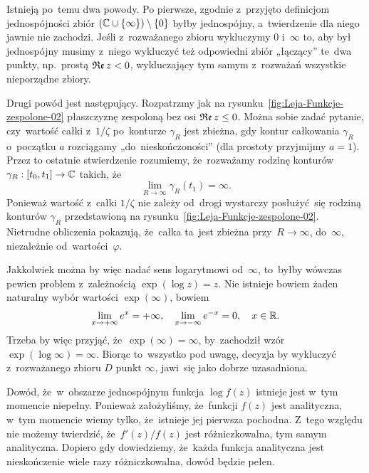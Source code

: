 \documentclass[a4paper,11pt]{article}
\begin{document}
Istnieją po~temu dwa powody. Po pierwsze, zgodnie z~przyjęto definicjom
jednospójności zbiór $( \mathbb{C} \cup \{ \infty \} ) \setminus \{ 0 \}$ byłby jednospójny,
a~twierdzenie dla niego jawnie nie zachodzi. Jeśli z~rozważanego zbioru
wykluczymy $0$ i~$\infty$ to, aby był jednospójny musimy z~niego wykluczyć też
odpowiedni zbiór „łączący” te~dwa punkty, np.~prostą $\operatorname{\mathfrak{Re}} z < 0$,
wykluczający tym samym z~rozważań wszystkie nieporządne zbiory.

Drugi powód jest następujący. Rozpatrzmy jak na
rysunku~\eqref{fig:Leja-Funkcje-zespolone-02} płaszczyznę zespoloną bez osi
$\operatorname{\mathfrak{Re}} z \leq 0$. Można sobie zadać pytanie, czy~wartość całki z~$1 / \zeta$
po~konturze $\gamma_{ R }$ jest zbieżna, gdy kontur całkowania $\gamma_{ R }$
o~początku $a$ rozciągamy „do~nieskończoności” (dla prostoty przyjmijmy
$a = 1$). Przez to ostatnie stwierdzenie rozumiemy, że~rozważamy rodzinę
konturów $\gamma_{ R }: [ t_{ 0 }, t_{ 1 } ] \to \mathbb{C}$ takich, że
\begin{equation}
  \label{eq:Leja-Funkcje-zespolone-39}
  \lim_{ R \to \infty } \gamma_{ R }( t_{ 1 } ) = \infty.
\end{equation}
Ponieważ wartość z~całki $1 / \zeta$ nie zależy od~drogi wystarczy
posłużyć~się rodziną konturów $\gamma_{ R }$ przedstawioną na
rysunku~\eqref{fig:Leja-Funkcje-zespolone-02}. Nietrudne obliczenia
pokazują, że~całka ta~jest zbieżna przy~$R \to \infty$, do~$\infty$, niezależnie
od~wartości~$\varphi$.

Jakkolwiek można by więc nadać sens logarytmowi od~$\infty$, to~byłby
wówczas pewien problem z~zależnością $\exp( \log z ) = z$. Nie
istnieje bowiem żaden naturalny wybór wartości $\exp( \infty )$, bowiem
\begin{equation}
  \label{eq:Leja-Funkcje-zespolone-40}
  \lim\limits_{ x \to +\infty } e^{ x } = +\infty, \quad
  \lim\limits_{ x \to -\infty } e^{ -x } = 0, \quad
  x \in \mathbb{R}.
\end{equation}
Trzeba by więc przyjąć, że~$\exp( \infty ) = \infty$, by~zachodził wzór
$\exp( \log \infty ) = \infty$. Biorąc to~wszystko pod uwagę, decyzja
by wykluczyć z~rozważanego zbioru $D$ punkt $\infty$, jawi~się jako
dobrze uzasadniona.

\vspace{\spaceFour}





\noindent
{} Dowód, że~w~obszarze jednospójnym funkcja $\log f( z )$ istnieje
jest w~tym momencie niepełny. Ponieważ założyliśmy, że~funkcji $f( z )$
jest analityczna, w~tym momencie wiemy tylko, że~istnieje jej pierwsza
pochodna. Z~tego względu nie możemy twierdzić, że~$f'( z ) / f( z )$ jest
różniczkowalna, tym samym analityczna. Dopiero gdy dowiedziemy, że~każda
funkcja analityczna jest nieskończenie wiele razy różniczkowalna, dowód
będzie pełen.
\end{document}
